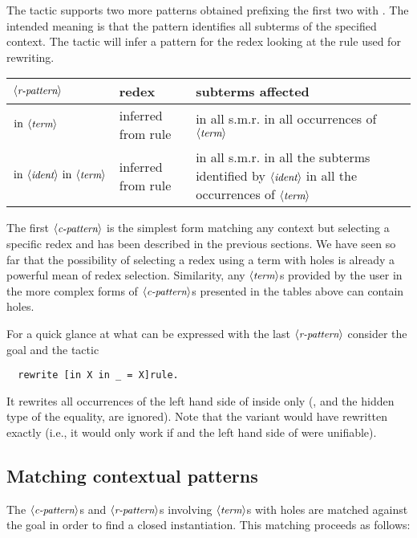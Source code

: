 The  tactic supports two more patterns obtained
prefixing the first two with . The intended meaning is that the 
pattern identifies all subterms of the specified context. The 
 tactic will infer a pattern for the redex looking at the
rule used for rewriting.

\begin{center}
\begin{tabularx}{\textwidth}{>{\arraybackslash}m{}|>{\arraybackslash}m{}|>{\arraybackslash}m{}}
$\langle\mbox{\itshape\rmfamily\small r-pattern}\rangle$ & redex & subterms affected \\
\hline
$\C{in}\ \N{term}$ & inferred from rule & 
  in all  s.m.r. in all occurrences of $\langle\mbox{\itshape\rmfamily\small term}\rangle$\\
\hline
$\C{in}\ \N{ident}\ \C{in}\ \N{term}$ & inferred from rule &
  in all  s.m.r. in all the subterms identified by $\langle\mbox{\itshape\rmfamily\small ident}\rangle$ in all 
  the occurrences of $\langle\mbox{\itshape\rmfamily\small term}\rangle$ \\
\hline
\end{tabularx}
\end{center}

The first $\langle\mbox{\itshape\rmfamily\small c-pattern}\rangle$ is the simplest form matching any
context but selecting a specific redex and has been described in the
previous sections. We have seen so far that the possibility of
selecting a redex using a term with holes is already a powerful mean of redex
selection. Similarity, any $\langle\mbox{\itshape\rmfamily\small term}\rangle$s provided by the
user in the more complex forms of $\langle\mbox{\itshape\rmfamily\small c-pattern}\rangle$s presented in the
tables above can contain holes. 

For a quick glance at what can be expressed with the last 
$\langle\mbox{\itshape\rmfamily\small r-pattern}\rangle$ consider the goal  and the tactic 
\begin{lstlisting}
  rewrite [in X in _ = X]rule.
\end{lstlisting}
It rewrites all occurrences of the left hand side of  inside
 only (, and the hidden type of the equality, are ignored).
Note that the variant  would have
rewritten  exactly (i.e., it would only work if  and the
left hand side of  were unifiable).

\subsection{Matching contextual patterns}

The $\langle\mbox{\itshape\rmfamily\small c-pattern}\rangle$s and $\langle\mbox{\itshape\rmfamily\small r-pattern}\rangle$s involving 
$\langle\mbox{\itshape\rmfamily\small term}\rangle$s with holes are matched
against the goal in order to find a closed instantiation. This
matching proceeds as follows:

